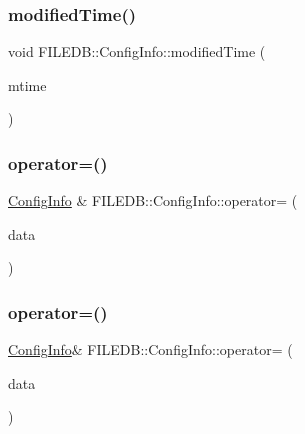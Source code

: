 \subsubsection{\texorpdfstring{modifiedTime()}{modifiedTime()}\hspace{0.1cm}{\footnotesize\ttfamily [6/6]}}
{\footnotesize\ttfamily void F\+I\+L\+E\+D\+B\+::\+Config\+Info\+::modified\+Time (\begin{DoxyParamCaption}\item[{int}]{mtime }\end{DoxyParamCaption})}

\mbox{\label{classFILEDB_1_1ConfigInfo_ac41b56638fe1c002bc2712d16c9cbecb}} 
\subsubsection{\texorpdfstring{operator=()}{operator=()}\hspace{0.1cm}{\footnotesize\ttfamily [1/3]}}
{\footnotesize\ttfamily \mbox{\hyperlink{classFILEDB_1_1ConfigInfo}{Config\+Info}} \& F\+I\+L\+E\+D\+B\+::\+Config\+Info\+::operator= (\begin{DoxyParamCaption}\item[{const \mbox{\hyperlink{classFILEDB_1_1ConfigInfo}{Config\+Info}} \&}]{data }\end{DoxyParamCaption})}

\mbox{\label{classFILEDB_1_1ConfigInfo_addda23bfc94267dee10eb00355316514}} 
\subsubsection{\texorpdfstring{operator=()}{operator=()}\hspace{0.1cm}{\footnotesize\ttfamily [2/3]}}
{\footnotesize\ttfamily \mbox{\hyperlink{classFILEDB_1_1ConfigInfo}{Config\+Info}}\& F\+I\+L\+E\+D\+B\+::\+Config\+Info\+::operator= (\begin{DoxyParamCaption}\item[{const \mbox{\hyperlink{classFILEDB_1_1ConfigInfo}{Config\+Info}} \&}]{data }\end{DoxyParamCaption})}

